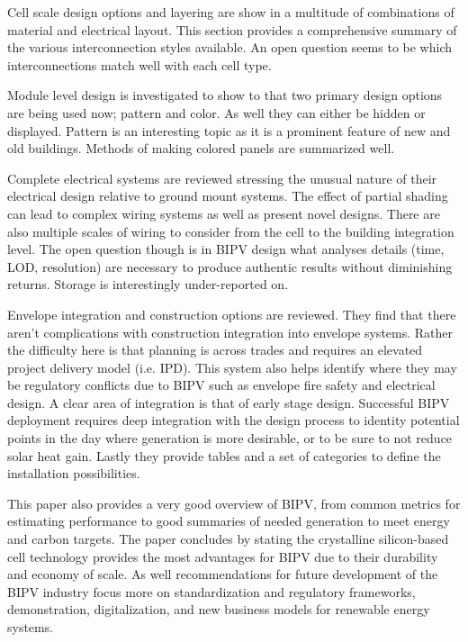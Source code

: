 \documentclass[11pt,a4paper]{article}
\newenvironment{itemize*}%
  {\begin{itemize}[rightmargin=\dimexpr\linewidth-120mm-\leftmargin\relax]%
    \setlength{\itemsep}{0pt}%
    \setlength{\parskip}{0pt}}%
  {\end{itemize}}
\begin{document}
\begin{itemize*}
    \item Cell scale design options and layering are show in a multitude of combinations of material and electrical layout. This section provides a comprehensive summary of the various interconnection styles available. An open question seems to be which interconnections match well with each cell type.
    \item Module level design is investigated to show to that two primary design options are being used now; pattern and color. As well they can either be hidden or displayed. Pattern is an interesting topic as it is a prominent feature of new and old buildings. Methods of making colored panels are summarized well.
    \item Complete electrical systems are reviewed stressing the unusual nature of their electrical design relative to ground mount systems. The effect of partial shading can lead to complex wiring systems as well as present novel designs. There are also multiple scales of wiring to consider from the cell to the building integration level. The open question though is in BIPV design what analyses details (time, LOD, resolution) are necessary to produce authentic results without diminishing returns. Storage is interestingly under-reported on.
    \item Envelope integration and construction options are reviewed. They find that there aren't complications with construction integration into envelope systems. Rather the difficulty here is that planning is across trades and requires an elevated project delivery model (i.e. IPD). This system also helps identify where they may be regulatory conflicts due to BIPV such as envelope fire safety and electrical design. A clear area of integration is that of early stage design. Successful BIPV deployment requires deep integration with the design process to identity potential points in the day where generation is more desirable, or to be sure to not reduce solar heat gain. Lastly they provide tables and a set of categories to define the installation possibilities.
\end{itemize*}
This paper also provides a very good overview of BIPV, from common metrics for estimating performance to good summaries of needed generation to meet energy and carbon targets.
The paper concludes by stating the crystalline silicon-based cell technology provides the most advantages for BIPV due to their durability and economy of scale. As well recommendations for future development of the BIPV industry focus more on standardization and regulatory frameworks, demonstration, digitalization, and new business models for renewable energy systems.
\end{document}
